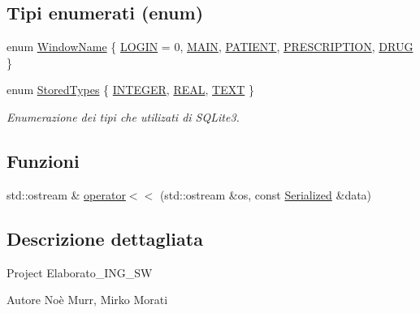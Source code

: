 \subsection*{Tipi enumerati (enum)}
\begin{DoxyCompactItemize}
\item 
enum \hyperlink{namespacemm_a4e9d92e04f65dbf2fc1963947da0d93c}{Window\+Name} \{ \newline
\hyperlink{namespacemm_a4e9d92e04f65dbf2fc1963947da0d93ca625866ddfe14a6b663c4b95ee85c96f3}{L\+O\+G\+IN} = 0, 
\hyperlink{namespacemm_a4e9d92e04f65dbf2fc1963947da0d93cafd935ea5cffd64386f1549c51642164e}{M\+A\+IN}, 
\hyperlink{namespacemm_a4e9d92e04f65dbf2fc1963947da0d93cadde39aa33fd198a60d8046fbdf5e631f}{P\+A\+T\+I\+E\+NT}, 
\hyperlink{namespacemm_a4e9d92e04f65dbf2fc1963947da0d93ca59fb5a42d012d17664b7e9e30b54928b}{P\+R\+E\+S\+C\+R\+I\+P\+T\+I\+ON}, 
\newline
\hyperlink{namespacemm_a4e9d92e04f65dbf2fc1963947da0d93ca72cf6d0691540154498bec70aa8556f6}{D\+R\+UG}
 \}
\item 
enum \hyperlink{namespacemm_ad5a796af6d7145f51e84a73ed35a601c}{Stored\+Types} \{ \hyperlink{namespacemm_ad5a796af6d7145f51e84a73ed35a601ca119c99336926ef6e9520a5bbf9518a9a}{I\+N\+T\+E\+G\+ER}, 
\hyperlink{namespacemm_ad5a796af6d7145f51e84a73ed35a601caac9e9001649c4d59b7b51aabfb92f331}{R\+E\+AL}, 
\hyperlink{namespacemm_ad5a796af6d7145f51e84a73ed35a601ca7c167dd1f2b3ccf8ed3938f0c4838ef5}{T\+E\+XT}
 \}\begin{DoxyCompactList}\small\item\em Enumerazione dei tipi che utilizati di S\+Q\+Lite3. \end{DoxyCompactList}
\end{DoxyCompactItemize}
\subsection*{Funzioni}
\begin{DoxyCompactItemize}
\item 
std\+::ostream \& \hyperlink{namespacemm_a7ab9a5d20c82db4778995f35e6aa6abb}{operator$<$$<$} (std\+::ostream \&os, const \hyperlink{structmm_1_1_serialized}{Serialized} \&data)
\end{DoxyCompactItemize}


\subsection{Descrizione dettagliata}
Project Elaborato\+\_\+\+I\+N\+G\+\_\+\+SW \begin{DoxyAuthor}{Autore}
Noè Murr, Mirko Morati 
\end{DoxyAuthor}


